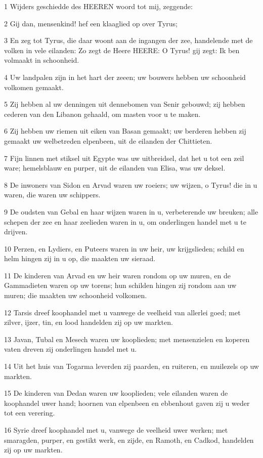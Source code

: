 \par 1 Wijders geschiedde des HEEREN woord tot mij, zeggende:
\par 2 Gij dan, mensenkind! hef een klaaglied op over Tyrus;
\par 3 En zeg tot Tyrus, die daar woont aan de ingangen der zee, handelende met de volken in vele eilanden: Zo zegt de Heere HEERE: O Tyrus! gij zegt: Ik ben volmaakt in schoonheid.
\par 4 Uw landpalen zijn in het hart der zeeen; uw bouwers hebben uw schoonheid volkomen gemaakt.
\par 5 Zij hebben al uw denningen uit dennebomen van Senir gebouwd; zij hebben cederen van den Libanon gehaald, om masten voor u te maken.
\par 6 Zij hebben uw riemen uit eiken van Basan gemaakt; uw berderen hebben zij gemaakt uw welbetreden elpenbeen, uit de eilanden der Chittieten.
\par 7 Fijn linnen met stiksel uit Egypte was uw uitbreidsel, dat het u tot een zeil ware; hemelsblauw en purper, uit de eilanden van Elisa, was uw deksel.
\par 8 De inwoners van Sidon en Arvad waren uw roeiers; uw wijzen, o Tyrus! die in u waren, die waren uw schippers.
\par 9 De oudsten van Gebal en haar wijzen waren in u, verbeterende uw breuken; alle schepen der zee en haar zeelieden waren in u, om onderlingen handel met u te drijven.
\par 10 Perzen, en Lydiers, en Puteers waren in uw heir, uw krijgslieden; schild en helm hingen zij in u op, die maakten uw sieraad.
\par 11 De kinderen van Arvad en uw heir waren rondom op uw muren, en de Gammadieten waren op uw torens; hun schilden hingen zij rondom aan uw muren; die maakten uw schoonheid volkomen.
\par 12 Tarsis dreef koophandel met u vanwege de veelheid van allerlei goed; met zilver, ijzer, tin, en lood handelden zij op uw markten.
\par 13 Javan, Tubal en Mesech waren uw kooplieden; met mensenzielen en koperen vaten dreven zij onderlingen handel met u.
\par 14 Uit het huis van Togarma leverden zij paarden, en ruiteren, en muilezels op uw markten.
\par 15 De kinderen van Dedan waren uw kooplieden; vele eilanden waren de koophandel uwer hand; hoornen van elpenbeen en ebbenhout gaven zij u weder tot een verering.
\par 16 Syrie dreef koophandel met u, vanwege de veelheid uwer werken; met smaragden, purper, en gestikt werk, en zijde, en Ramoth, en Cadkod, handelden zij op uw markten.
